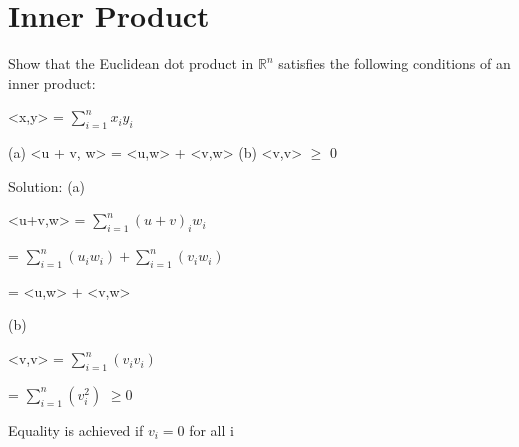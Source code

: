 \documentclass[11pt]{article}
\begin{document}
\newpage

\section{Inner Product}
Show that the Euclidean dot product in $\mathbb{R}^{n}$ satisfies the following conditions of an inner product:\newline

\begin{center}

<x,y> = $\sum_{i = 1}^{n} x_i y_i $

\end{center}

(a) <u + v, w> = <u,w> + <v,w>\newline
(b) <v,v> $\geq$ 0

\vspace{4mm}

{\color{blue}
Solution:\newline
(a) 
\begin{center}

<u+v,w> = $\sum_{i = 1}^{n}(u+v)_i w_i$

\end{center}
\vspace{3mm}
\begin{center}

= $\sum_{i = 1}^{n}(u_i w_i) + \sum_{i = 1}^{n}(v_i w_i)$

\end{center}
\vspace{3mm}
\begin{center}

= <u,w> + <v,w>

\end{center}

(b) 
\begin{center}

<v,v> = $\sum_{i = 1}^{n}(v_i v_i)$

\end{center}
\vspace{3mm}
\begin{center}

= $\sum_{i = 1}^{n}(v_i^2)$ $\geq 0 $

\end{center}

Equality is achieved if $v_i = 0$ for all i


}


\vspace{4mm}
\newpage
\end{document}
